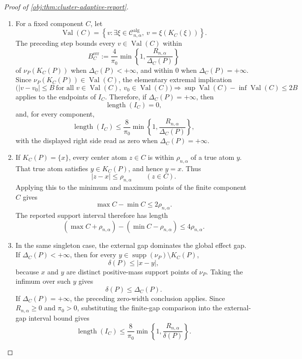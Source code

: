 \documentclass[11pt]{article}
\begin{document}
\begin{proof}[Proof of \cref{obj:thm:cluster-adaptive-report}]
\begin{enumerate}
\item For a fixed component \(C\), let
\[
\operatorname{Val}(C)
=
\left\{v:\exists \xi\in\mathcal C^{\mathrm{alg}}_{n,\alpha},\
v=\xi(K_C(\xi))\right\}.
\]
The preceding step bounds every \(v\in\operatorname{Val}(C)\) within
\[
B_C^{\mathrm{err}}
:=
\frac{4}{\pi_0}
\min\left\{1,\frac{R_{n,\alpha}}{\Delta_C(P)}\right\}
\]
of \(\nu_P(K_C(P))\) when \(\Delta_C(P)<+\infty\), and within \(0\) when
\(\Delta_C(P)=+\infty\).  Since
\(\nu_P(K_C(P))\in\operatorname{Val}(C)\), the elementary extremal implication
\[
\bigl(|v-v_0|\le B\ \text{for all }v\in\operatorname{Val}(C),\
v_0\in\operatorname{Val}(C)\bigr)
\Longrightarrow
\sup\operatorname{Val}(C)-\inf\operatorname{Val}(C)\le2B
\]
applies to the endpoints of \(I_C\).  Therefore, if \(\Delta_C(P)=+\infty\),
then
\[
\operatorname{length}(I_C)=0,
\]
and, for every component,
\[
\operatorname{length}(I_C)
\le
\frac{8}{\pi_0}
\min\left\{1,\frac{R_{n,\alpha}}{\Delta_C(P)}\right\},
\]
with the displayed right side read as zero when
\(\Delta_C(P)=+\infty\). %

\item If \(K_C(P)=\{x\}\), every center atom \(z\in C\) is within
\(\rho_{n,\alpha}\) of a true atom \(y\).  That true atom satisfies
\(y\in K_C(P)\), and hence \(y=x\).  Thus
\[
|z-x|\le\rho_{n,\alpha}\qquad(z\in C).
\]
Applying this to the minimum and maximum points of the finite component \(C\)
gives
\[
\max C-\min C\le2\rho_{n,\alpha}.
\]
The reported support interval therefore has length
\[
(\max C+\rho_{n,\alpha})-(\min C-\rho_{n,\alpha})
\le4\rho_{n,\alpha}. %
\]

\item In the same singleton case, the external gap dominates the global effect
gap.  If \(\Delta_C(P)<+\infty\), then for every
\(y\in\operatorname{supp}(\nu_P)\setminus K_C(P)\),
\[
\delta(P)\le |x-y|,
\]
because \(x\) and \(y\) are distinct positive-mass support points of
\(\nu_P\).  Taking the infimum over such \(y\) gives
\[
\delta(P)\le \Delta_C(P).
\]
If \(\Delta_C(P)=+\infty\), the preceding zero-width conclusion applies.  Since
\(R_{n,\alpha}\ge0\) and \(\pi_0>0\), substituting the finite-gap comparison
into the external-gap interval bound gives
\[
\operatorname{length}(I_C)
\le
\frac{8}{\pi_0}
\min\left\{1,\frac{R_{n,\alpha}}{\delta(P)}\right\}. %
\]


\end{enumerate}
\end{proof}
\end{document}
